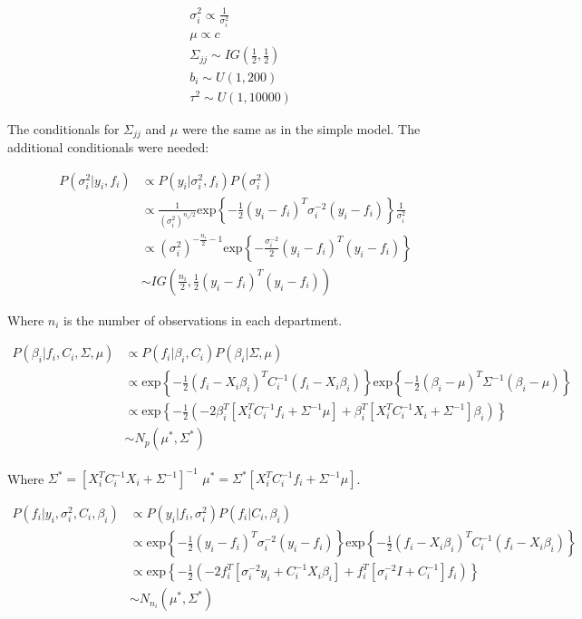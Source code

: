 \documentclass[paper=a4, fontsize=11pt]{scrartcl}
\begin{document}
\begin{align*}
    & \sigma^2_i \propto \frac{1}{\sigma^2_i}\\
    & \mu \propto c \\
    & \Sigma_{jj} \sim IG \left(\frac{1}{2}, \frac{1}{2} \right)\\
    & b_i \sim U(1, 200)\\
    & \tau^2 \sim U(1, 10000)
\end{align*}


The conditionals for $\Sigma_{jj}$ and $\mu$ were the same as in the simple model. The  additional conditionals were needed:



\begin{align*}
     P(\sigma^2_i |y_i, f_i ) & \propto P(y_i| \sigma^2_i, f_i)P(\sigma^2_i)\\
     & \propto \frac{1}{(\sigma^2_i)^{n_i/2}} \mbox{exp}\left \{ -\frac{1}{2}(y_i-f_i)^T \sigma^{-2}_i(y_i-f_i)      \right \} \frac{1}{\sigma^2_i}\\
      & \propto (\sigma^2_i)^{-\frac{n_i}{2}-1} \mbox{exp}\left \{ -\frac{\sigma^{-2}_i}{2}(y_i-f_i)^T (y_i-f_i)\right \} \\
      &  \sim IG\left(\frac{n_i}{2}, \frac{1}{2}(y_i-f_i)^T (y_i-f_i)\right)
\end{align*}

Where $n_i$ is the number of observations in each department.

\begin{align*}
     P(\beta_i | f_i, C_i, \Sigma, \mu ) & \propto P(f_i| \beta_i, C_i)P(\beta_i| \Sigma, \mu) \\
     & \propto\mbox{exp}\left \{ -\frac{1}{2}(f_i-X_i\beta_i)^T C^{-1}_i(f_i-X_i\beta_i)      \right \} \mbox{exp}\left \{ -\frac{1}{2}(\beta_i-\mu)^T \Sigma^{-1}(\beta_i-\mu)      \right \} \\
     & \propto \mbox{exp}\left \{ -\frac{1}{2}\left(-2\beta_i^T[X_i^TC_i^{-1}f_i + \Sigma^{-1}\mu] + \beta_i^T[X^T_iC_i^{-1}X_i + 
     \Sigma^{-1}]\beta_i \right)      \right \}\\
    &\sim N_p (\mu^*, \Sigma^*)
\end{align*}


Where  $\Sigma^*=[X^T_iC_i^{-1}X_i + 
     \Sigma^{-1}]^{-1} $ $\mu^*=\Sigma^*[X_i^TC_i^{-1}f_i + \Sigma^{-1}\mu]$.



\begin{align*}
     P(f_i |y_i, \sigma_i^2, C_i, \beta_i) & \propto P(y_i| f_i, \sigma_i^2)P(f_i|C_i, \beta_i) \\
      & \propto  \mbox{exp}\left \{ -\frac{1}{2}(y_i-f_i)^T \sigma^{-2}_i(y_i-f_i)      \right \} \mbox{exp}\left \{ -\frac{1}{2}(f_i-X_i\beta_i)^T C_i^{-1}(f_i-X_i\beta_i)      \right \} \\
       & \propto  \mbox{exp}\left \{ -\frac{1}{2}(-2f_i^T[\sigma_i^{-2}y_i + C_i^{-1}X_i\beta_i]+f_i^T[\sigma_i^{-2}I + C_i^{-1}]f_i) \right \}\\
        &\sim N_{n_i} (\mu^*, \Sigma^*)
\end{align*}
\end{document}
